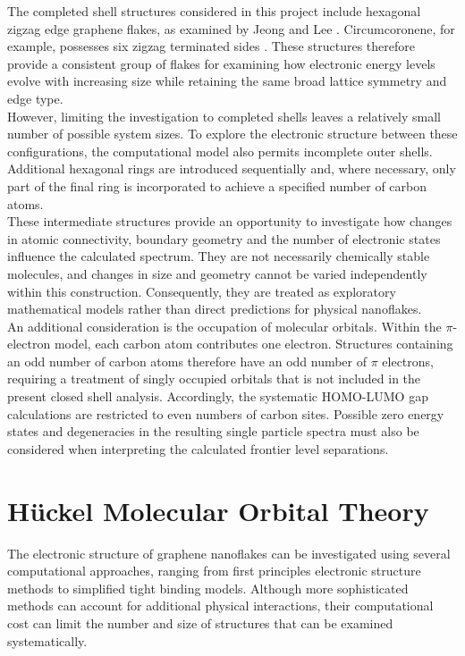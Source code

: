 \noindent The completed shell structures considered in this project include hexagonal zigzag edge graphene flakes, as examined by Jeong and Lee \parencite{jeongCalculationElectronicStructures2024}. Circumcoronene, for example, possesses six zigzag terminated sides \parencite{zou_circumcoronenes_2023}. These structures therefore provide a consistent group of flakes for examining how electronic energy levels evolve with increasing size while retaining the same broad lattice symmetry and edge type. \\

\noindent However, limiting the investigation to completed shells leaves a relatively small number of possible system sizes. To explore the electronic structure between these configurations, the computational model also permits incomplete outer shells. Additional hexagonal rings are introduced sequentially and, where necessary, only part of the final ring is incorporated to achieve a specified number of carbon atoms. \\

\noindent These intermediate structures provide an opportunity to investigate how changes in atomic connectivity, boundary geometry and the number of electronic states influence the calculated spectrum. They are not necessarily chemically stable molecules, and changes in size and geometry cannot be varied independently within this construction. Consequently, they are treated as exploratory mathematical models rather than direct predictions for physical nanoflakes. \\

\noindent An additional consideration is the occupation of molecular orbitals. Within the $\pi$-electron model, each carbon atom contributes one electron. Structures containing an odd number of carbon atoms therefore have an odd number of $\pi$ electrons, requiring a treatment of singly occupied orbitals that is not included in the present closed shell analysis. Accordingly, the systematic HOMO-LUMO gap calculations are restricted to even numbers of carbon sites. Possible zero energy states and degeneracies in the resulting single particle spectra must also be considered when interpreting the calculated frontier level separations.


\section{H\"uckel Molecular Orbital Theory}
\label{sec:huckel_motivation}

The electronic structure of graphene nanoflakes can be investigated using several computational approaches, ranging from first principles electronic structure methods to simplified tight binding models. Although more sophisticated methods can account for additional physical interactions, their computational cost can limit the number and size of structures that can be examined systematically. \\


